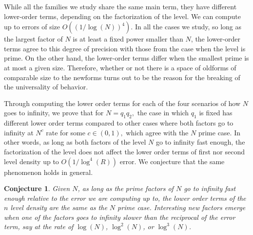 \documentclass[11pt, reqno]{amsart}
\newtheorem{conjecture}[theorem]{Conjecture}
\theoremstyle{definition}
\theoremstyle{remark}
\numberwithin{equation}{section}
\begin{document}
While all the families we study share the same main term, they have different lower-order terms, depending on the factorization of the level. We can compute up to errors of size $O((1/\log(N))^4)$. In all the cases we study, so long as the largest factor of $N$ is at least a fixed power smaller than $N$, the lower-order terms agree to this degree of precision with those from the case when the level is prime. On the other hand, the lower-order terms differ when the smallest prime is at most a given size. Therefore, whether or not there is a space of oldforms of comparable size to the newforms turns out to be the reason for the breaking of the universality of behavior. 


Through computing the lower order terms for each of the four scenarios of how $N$ goes to infinity, we prove that for $N = q_1q_2,$ the case in which $q_1$ is fixed has different lower order terms compared to 
other cases where both factors go to infinity at $N^{c}$ rate for some $c \in (0,1),$ which agree with the $N$ prime case. In other words, as long as both factors of the level $N$ go to infinity fast enough, the factorization of the level does not affect the lower order terms of first nor second level density up to $O\left(1/{\log^4(R)}\right)$ error. We conjecture that the same phenomenon holds in general. 

\begin{conjecture}
 Given $N$, as long as the prime factors of $N$ go to infinity fast enough relative to the error we are computing up to, the lower order terms of the $n$ level density are the same as the $N$ prime case. Interesting new factors emerge when one of the factors goes to infinity slower than the reciprocal of the error term, say at the rate of $\log(N)$, $\log^2(N)$, or $\log^3(N)$. 
 \end{conjecture}
\end{document}
